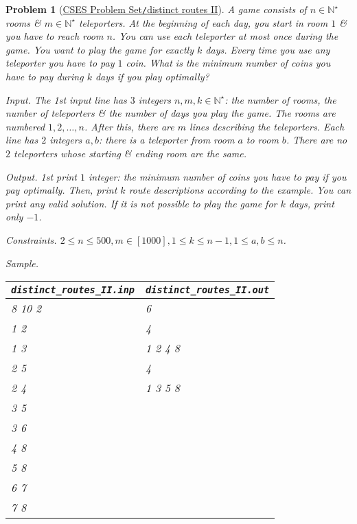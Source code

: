\documentclass{article}
\newtheorem{problem}{Problem}
\begin{document}
\begin{problem}[\href{https://cses.fi/problemset/task/2130}{CSES Problem Set{\tt/}distinct routes II}]
    A game consists of $n\in\mathbb{N}^\star$ rooms \& $m\in\mathbb{N}^\star$ teleporters. At the beginning of each day, you start in room $1$ \& you have to reach room $n$. You can use each teleporter at most once during the game. You want to play the game for exactly $k$ days. Every time you use any teleporter you have to pay $1$ coin. What is the minimum number of coins you have to pay during $k$ days if you play optimally?
    \item {\sf Input.} The 1st input line has $3$ integers $n,m,k\in\mathbb{N}^\star$: the number of rooms, the number of teleporters \& the number of days you play the game. The rooms are numbered $1,2,\ldots,n$. After this, there are $m$ lines describing the teleporters. Each line has $2$ integers $a,b$: there is a teleporter from room $a$ to room $b$. There are no $2$ teleporters whose starting \& ending room are the same.
    \item {\sf Output.} 1st print $1$ integer: the minimum number of coins you have to pay if you pay optimally. Then, print $k$ route descriptions according to the example. You can print any valid solution. If it is not possible to play the game for $k$ days, print only $-1$.
    \item {\sf Constraints.} $2\le n\le500,m\in[1000],1\le k\le n - 1,1\le a,b\le n$.
    \item {\sf Sample.}
    \begin{table}[H]
        \centering
        \begin{tabular}{|l|l|}
            \hline
            \verb|distinct_routes_II.inp| & \verb|distinct_routes_II.out| \\
            \hline
            8 10 2 & 6 \\
            1 2 & 4 \\
            1 3 & 1 2 4 8 \\
            2 5 & 4 \\
            2 4 & 1 3 5 8 \\
            3 5 & \\
            3 6 & \\
            4 8 & \\
            5 8 & \\
            6 7  & \\
            7 8 & \\
            \hline
        \end{tabular}
    \end{table}
\end{problem}
\end{document}
